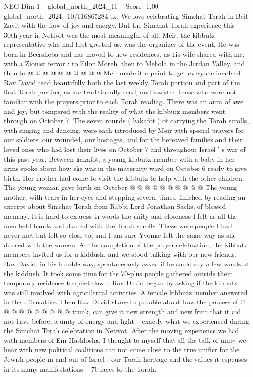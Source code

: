 \begin{textsample}{NEG Dim 1 – global\_north\_2024\_10 – Score -1.00 – global\_north\_2024\_10/116865284.txt}
We love celebrating Simchat Torah in Beit Zayit with the flow of joy and energy.
But the Simchat Torah experience this 30th year in Netivot was the most meaningful of all.
Meir, the kibbutz representative who had first greeted us, was the organizer of the event.
He was born in Beersheba and has moved to new residences, as his wife shared with me, with a Zionist fervor : to Eilon Moreh, then to Mehola in the Jordan Valley, and then to @ @ @ @ @ @ @ @ @ @ Meir made it a point to get everyone involved.
Rav David read beautifully both the last weekly Torah portion and part of the first Torah portion, as are traditionally read, and assisted those who were not familiar with the prayers prior to each Torah reading.
There was an aura of awe and joy, but tempered with the reality of what the kibbutz members went through on October 7.
The seven rounds ( hakafot ) of carrying the Torah scrolls, with singing and dancing, were each introduced by Meir with special prayers for our soldiers, our wounded, our hostages, and for the bereaved families and their loved ones who had lost their lives on October 7 and throughout Israel ' s war of this past year.
Between hakafot, a young kibbutz member with a baby in her arms spoke about how she was in the maternity ward on October 6 ready to give birth.
Her mother had come to visit the kibbutz to help with the other children.
The young woman gave birth on October @ @ @ @ @ @ @ @ @ @ The young mother, with tears in her eyes and stopping several times, finished by reading an excerpt about Simchat Torah from Rabbi Lord Jonathan Sacks, of blessed memory.
It is hard to express in words the unity and closeness I felt as all the men held hands and danced with the Torah scrolls.
These were people I had never met but felt so close to, and I am sure Yvonne felt the same way as she danced with the women.
At the completion of the prayer celebration, the kibbutz members invited us for a kiddush, and we stood talking with our new friends.
Rav David, in his humble way, spontaneously asked if he could say a few words at the kiddush.
It took some time for the 70-plus people gathered outside their temporary residence to quiet down.
Rav David began by asking if the kibbutz was still involved with agricultural activities.
A female kibbutz member answered in the affirmative.
Then Rav David shared a parable about how the process of @ @ @ @ @ @ @ @ @ @ trunk, can give it new strength and new fruit that it did not have before, a unity of energy and light -- exactly what we experienced during the Simchat Torah celebration in Netivot.
After the moving experience we had with members of Ein Hashlosha, I thought to myself that all the talk of unity we hear with new political coalitions can not come close to the true unifier for the Jewish people in and out of Israel : our Torah heritage and the values it espouses in its many manifestations -- 70 faces to the Torah.

\end{textsample}
